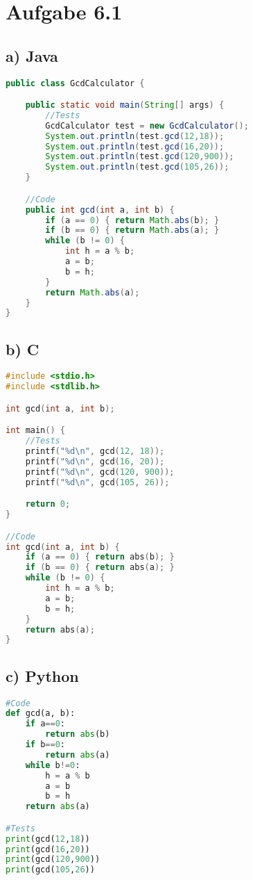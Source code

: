 \documentclass[a4paper,11pt]{scrartcl}
\begin{document}
		
	\section*{Aufgabe 6.1} 
	\subsection*{a) Java}
	    	\begin{lstlisting}[language=Java]
public class GcdCalculator {

    public static void main(String[] args) {
        //Tests
        GcdCalculator test = new GcdCalculator();
        System.out.println(test.gcd(12,18));
        System.out.println(test.gcd(16,20));
        System.out.println(test.gcd(120,900));
        System.out.println(test.gcd(105,26));
    }

    //Code
    public int gcd(int a, int b) {
        if (a == 0) { return Math.abs(b); }
        if (b == 0) { return Math.abs(a); }
        while (b != 0) {
            int h = a % b;
            a = b;
            b = h;
        }
        return Math.abs(a);
    }
}
            \end{lstlisting}
	
	\subsection*{b) C}
        \begin{lstlisting}[language=C]
#include <stdio.h>
#include <stdlib.h>

int gcd(int a, int b);

int main() {
    //Tests
    printf("%d\n", gcd(12, 18));
    printf("%d\n", gcd(16, 20));
    printf("%d\n", gcd(120, 900));
    printf("%d\n", gcd(105, 26));

    return 0;
}

//Code
int gcd(int a, int b) {
    if (a == 0) { return abs(b); }
    if (b == 0) { return abs(a); }
    while (b != 0) {
        int h = a % b;
        a = b;
        b = h;
    }
    return abs(a);
}
        \end{lstlisting}
    
    \newpage
    \subsection*{c) Python}
        \begin{lstlisting}[language=Python]
#Code
def gcd(a, b):
    if a==0: 
        return abs(b)
    if b==0:
        return abs(a)
    while b!=0:
        h = a % b
        a = b
        b = h
    return abs(a)

#Tests
print(gcd(12,18))
print(gcd(16,20))
print(gcd(120,900))
print(gcd(105,26))
        \end{lstlisting}
\end{document}
